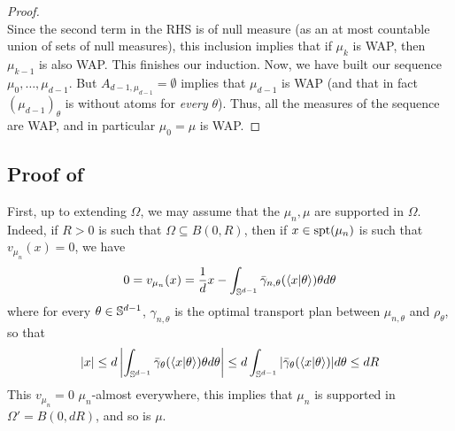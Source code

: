 \begin{proof}
\begin{equation}
    \end{equation}
    Since the second term in the RHS is of null measure (as an at most countable union of sets of null measures), this inclusion implies that if $\mu_k$ is WAP, then $\mu_{k-1}$ is also WAP. This finishes our induction. \newline
    Now, we have built our sequence $\mu_0,\ldots,\mu_{d-1}$. But $A_{d-1,\mu_{d-1}} = \emptyset$ implies that $\mu_{d-1}$ is WAP (and that in fact $(\mu_{d-1})_\theta$ is without atoms for \textit{every} $\theta$). Thus, all the measures of the sequence are WAP, and in particular $\mu_0 = \mu$ is WAP.
\end{proof}

\subsection{Proof of \texorpdfstring{}{}} \label{sec:th_weak_convergence_crit_points}

First, up to extending $\Omega$, we may assume that the $\mu_n, \mu$ are supported in $\Omega$. Indeed, if $R > 0$ is such that $\Omega \subseteq B(0,R)$, then if $x \in \mathrm{spt}(\mu_n)$ is such that $v_{\mu_n}(x) = 0$, we have
\begin{equation}
    0 = v_{\mu_n}(x) = \frac 1d x - \int_{\mathbb S^{d-1}} \bar{\gamma}_{n,\theta}(\langle x|\theta\rangle) \theta d\theta
\end{equation}
where for every $\theta \in \mathbb S^{d-1}$, $\gamma_{n,\theta}$ is the optimal transport plan between $\mu_{n,\theta}$ and $\rho_\theta$, so that
\begin{equation}
    |x| \leq d \left|\int_{\mathbb S^{d-1}} \bar{\gamma}_\theta(\langle x|\theta\rangle) \theta d\theta\right| \leq d \int_{\mathbb S^{d-1}} |\bar{\gamma}_\theta(\langle x|\theta\rangle)| d\theta \leq dR
\end{equation}
This $v_{\mu_n} = 0$ $\mu_n$-almost everywhere, this implies that $\mu_n$ is supported in $\Omega' = B(0,dR)$, and so is $\mu$. \newline

